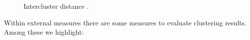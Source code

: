 \begin{figure}[htbp]
  \centering
    \caption{Intercluster distance \citep{R:arnol-deanw-others:2002}.}%
    \label{fig:separation}%
\end{figure}
Within external measures there are some measures to evaluate clustering results. Among these we highlight:

